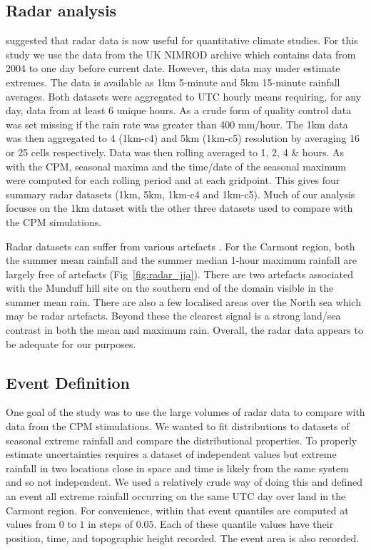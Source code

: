\documentclass[11pt,a4paper]{article}
\begin{document}
\subsection{Radar analysis}
\cite{saltikoff2019radar_climate} suggested that radar data is now useful for quantitative climate studies.   For this study we use the data from the UK NIMROD archive which contains data from 2004 to one day before current date\parencite{radar_data}. However, this data may under estimate extremes\parencite{harrison2000nimrod}. The data is available  as  1km 5-minute and 5km 15-minute rainfall averages.  Both datasets  were aggregated to UTC hourly means requiring, for any day, data from at least 6  unique hours. As a crude form of quality control data was set missing if the rain rate was greater than 400 mm/hour.  The 1km data was then aggregated to 4 (1km-c4) and 5km (1km-c5) resolution by averaging 16 or 25 cells respectively. Data was then rolling averaged to 1, 2, 4 \& hours. As with the CPM,  seasonal maxima and the time/date of the seasonal maximum were computed for each rolling period and at each gridpoint. This gives four summary radar datasets (1km, 5km,  1km-c4 and  1km-c5). Much of our analysis focuses on the 1km dataset with the  other three datasets used to compare with the CPM simulations. 

Radar datasets can suffer from various artefacts \parencite{Overeem2023euradclim}.
For the Carmont region, both the summer mean rainfall and the summer median 1-hour maximum rainfall are largely free of artefacts (Fig~\ref{fig:radar_jja}). There are two artefacts associated with the Munduff hill site on the southern end of the domain visible in the summer mean rain. There are also a few localised areas over the North sea which may be radar artefacts.  Beyond these the clearest signal is a strong land/sea contrast in both the mean and maximum rain. Overall, the radar data appears to be adequate for our purposes.  

\subsection{Event Definition}

One goal of the study was to use the large volumes of radar data to compare with data from the CPM stimulations. We  wanted  to fit distributions to  datasets of seasonal extreme rainfall and compare the distributional properties. To properly estimate uncertainties requires a dataset of independent values but extreme rainfall in two locations close in space and time is likely from the same system and so not independent. We used a relatively crude way of doing this and defined an event  all extreme rainfall occurring on the same UTC day over land in the Carmont region.  For convenience, within that event quantiles are computed at values from $0$ to $1$ in steps of $0.05$. Each of these quantile values have their position, time, and topographic height recorded. The event area is also recorded.  
\end{document}
